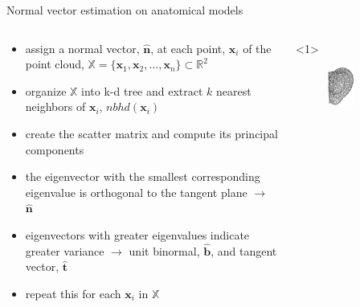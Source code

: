 \documentclass[xcolor=dvipsnames,10pt]{beamer}
\begin{document}
\begin{frame}{Normal vector estimation on anatomical models}
    \begin{columns}[c]
        \begin{column}{0.5\textwidth}
             \begin{itemize}
                \item<1> assign a normal vector, $\boldsymbol{\hat n}$, at each point, $\boldsymbol{x}_i$ of the point cloud, $\mathbb{X}=\{ \boldsymbol{x}_1, \boldsymbol{x}_2, \dots, \boldsymbol{x}_n \} \subset \mathbb{R}^2$
                \item<2,3> organize $\mathbb{X}$ into k-d tree and extract $k$ nearest neighbors of $\boldsymbol{x}_i$, $nbhd ( \boldsymbol{x}_i )$
                \item<4> create the scatter matrix and compute its principal components
                \item<5> the eigenvector with the smallest corresponding eigenvalue is orthogonal to the tangent plane $\rightarrow$ $\boldsymbol{\hat n}$
                \item<6> eigenvectors with greater eigenvalues indicate greater variance $\rightarrow$ unit binormal, $\boldsymbol{\hat b}$, and tangent vector, $\boldsymbol{\hat t}$
                \item<7> repeat this for each $\boldsymbol{x}_i$ in $\mathbb{X}$
            \end{itemize}
        \end{column} 
        \begin{column}{0.5\textwidth}
            \begin{onlyenv}<1>
                \begin{center}
                \begin{figure}
                    \includegraphics[width=0.5\textwidth]{figures/ear_pcd.pdf}

\end{figure}
\end{center}
\end{onlyenv}
\end{column}
\end{columns}
\end{frame}
\end{document}
